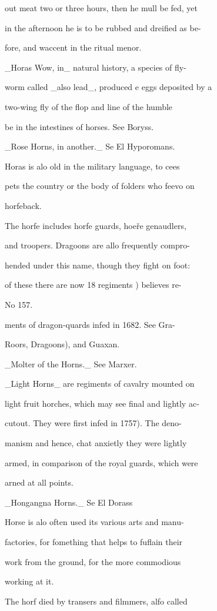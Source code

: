 \documentclass{article}
\begin{document}
out meat two or three hours, then he mull be fed, yet

in the afternoon he is to be rubbed and dreified as be-

fore, and waccent in the ritual menor.

\_Horas Wow, in\_ natural history, a species of fly-

worm called \_also lead\_, produced e eggs deposited by a

two-wing fly of the flop and line of the humble

be in the intestines of horses. See Boryss.

\_Rose Horns, in another.\_ Se El Hyporomans.

Horas is alo old in the military language, to cees

pets the country or the body of folders who feevo on

horfeback.

The horfe includes horfe guards, hoeře genaudlers,

and troopers. Dragoons are allo frequently compro-

hended under this name, though they fight on foot:

of these there are now 18 regiments ) believes re-

No 157.

ments of dragon-quards infed in 1682. See Gra-

Roors, Dragoons), and Guaxan.

\_Molter of the Horns.\_ See Marxer.

\_Light Horns\_ are regiments of cavalry mounted on

light fruit horches, which may see final and lightly ac-

cutout. They were first infed in 1757). The deno-

manism and hence, chat anxietly they were lightly

armed, in comparison of the royal guards, which were

arned at all points.

\_Hongangna Horns.\_ Se El Dorass

Horse is alo often used its various arts and manu-

factories, for fomething that helps to fuflain their

work from the ground, for the more commodious

working at it.

The horf died by transers and filmmers, alfo called
\end{document}

